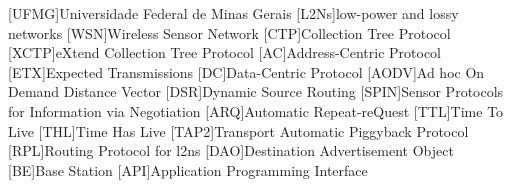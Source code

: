 
[UFMG]{Universidade Federal de Minas Gerais}
[L2Ns]{low-power and lossy networks}
[WSN]{Wireless Sensor Network}
[CTP]{Collection Tree Protocol}
[XCTP]{eXtend Collection Tree Protocol}
[AC]{Address-Centric Protocol}
[ETX]{Expected Transmissions}
[DC]{Data-Centric Protocol}
[AODV]{Ad hoc On Demand Distance Vector} 
[DSR]{Dynamic Source Routing} [SPIN]{Sensor Protocols for Information via
Negotiation} 
[ARQ]{Automatic Repeat-reQuest}
[TTL]{Time To Live}
[THL]{Time Has Live}
[TAP2]{Transport Automatic Piggyback Protocol}
[RPL]{Routing Protocol for \acl{l2ns}}
[DAO]{Destination Advertisement Object}
[BE]{Base Station}
[API]{Application Programming Interface}

